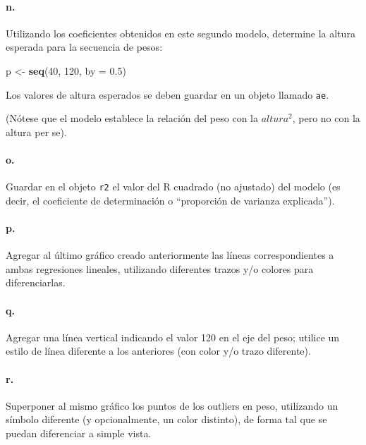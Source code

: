 \documentclass[]{article}
\newenvironment{Shaded}{}{}
\newcommand{\KeywordTok}[1]{\textcolor[rgb]{0.00,0.44,0.13}{\textbf{{#1}}}}
\newcommand{\DataTypeTok}[1]{\textcolor[rgb]{0.56,0.13,0.00}{{#1}}}
\newcommand{\DecValTok}[1]{\textcolor[rgb]{0.25,0.63,0.44}{{#1}}}
\newcommand{\FloatTok}[1]{\textcolor[rgb]{0.25,0.63,0.44}{{#1}}}
\newcommand{\NormalTok}[1]{{#1}}
\begin{document}
\paragraph{n.}

Utilizando los coeficientes obtenidos en este segundo modelo, determine
la altura esperada para la secuencia de pesos:

\begin{Shaded}
\begin{Highlighting}[]
\NormalTok{p <- }\KeywordTok{seq}\NormalTok{(}\DecValTok{40}\NormalTok{, }\DecValTok{120}\NormalTok{, }\DataTypeTok{by =} \FloatTok{0.5}\NormalTok{)}
\end{Highlighting}
\end{Shaded}
Los valores de altura esperados se deben guardar en un objeto llamado
\texttt{ae}.

(Nótese que el modelo establece la relación del peso con la
$altura ^ 2$, pero no con la altura per se).

\paragraph{o.}

Guardar en el objeto \texttt{r2} el valor del R cuadrado (no ajustado)
del modelo (es decir, el coeficiente de determinación o ``proporción de
varianza explicada'').

\paragraph{p.}

Agregar al último gráfico creado anteriormente las líneas
correspondientes a ambas regresiones lineales, utilizando diferentes
trazos y/o colores para diferenciarlas.

\paragraph{q.}

Agregar una línea vertical indicando el valor 120 en el eje del peso;
utilice un estilo de línea diferente a los anteriores (con color y/o
trazo diferente).

\paragraph{r.}

Superponer al mismo gráfico los puntos de los outliers en peso,
utilizando un símbolo diferente (y opcionalmente, un color distinto), de
forma tal que se puedan diferenciar a simple vista.
\end{document}
